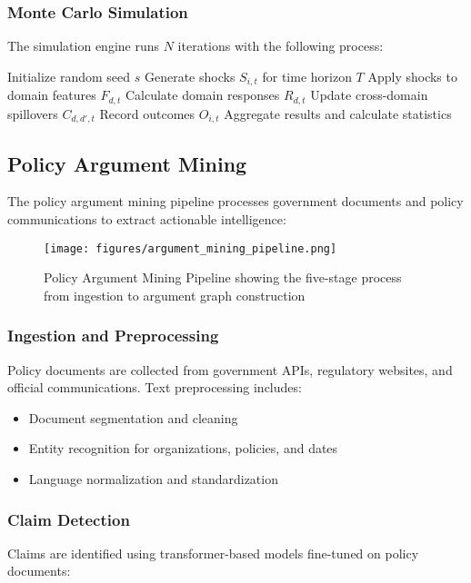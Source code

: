 \documentclass[conference]{IEEEtran}
\begin{document}
\subsubsection{Monte Carlo Simulation}
The simulation engine runs $N$ iterations with the following process:

\begin{algorithmic}
\STATE Initialize random seed $s$
    \STATE Generate shocks $S_{i,t}$ for time horizon $T$
    \STATE Apply shocks to domain features $F_{d,t}$
    \STATE Calculate domain responses $R_{d,t}$
    \STATE Update cross-domain spillovers $C_{d,d',t}$
    \STATE Record outcomes $O_{i,t}$
\ENDFOR
\STATE Aggregate results and calculate statistics
\end{algorithmic}

\subsection{Policy Argument Mining}

The policy argument mining pipeline processes government documents and policy communications to extract actionable intelligence:

\begin{figure}[H]
\centering
\texttt{[image: figures/argument\_mining\_pipeline.png]}
\caption{Policy Argument Mining Pipeline showing the five-stage process from ingestion to argument graph construction}
\label{fig:argument_pipeline}
\end{figure}

\subsubsection{Ingestion and Preprocessing}
Policy documents are collected from government APIs, regulatory websites, and official communications. Text preprocessing includes:
\begin{itemize}
    \item Document segmentation and cleaning
    \item Entity recognition for organizations, policies, and dates
    \item Language normalization and standardization
\end{itemize}

\subsubsection{Claim Detection}
Claims are identified using transformer-based models fine-tuned on policy documents:
\end{document}
